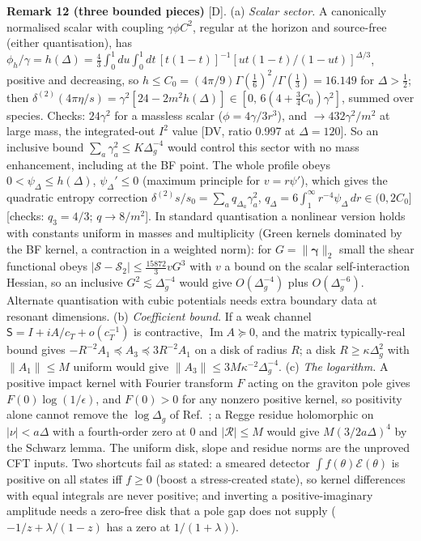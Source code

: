 \textbf{Remark 12 (three bounded pieces)} [D]. (a) \emph{Scalar sector.} A canonically normalised scalar with coupling $\gamma\phi C^2$, regular at the
horizon and source-free (either quantisation), has $\phi_h/\gamma=h(\Delta)=\tfrac43\int_0^1\!du\int_0^1\!dt\,[t(1-t)]^{-1}[ut(1-t)/(1-ut)]^{\Delta/3}$,
positive and decreasing, so $h\le C_0=(4\pi/9)\Gamma(\tfrac16)^2/\Gamma(\tfrac13)=16.149$ for $\Delta>\tfrac12$; then
$\delta^{(2)}(4\pi\eta/s)=\gamma^2[24-2m^2h(\Delta)]\in[0,\,6(4+\tfrac34C_0)\gamma^2]$, summed over species. Checks: $24\gamma^2$ for a massless scalar
($\phi=4\gamma/3r^3$), and $\to432\gamma^2/m^2$ at large mass, the integrated-out $I^2$ value [DV, ratio 0.997 at $\Delta=120$]. So an inclusive bound
$\sum_a\gamma_a^2\le K\Delta_g^{-4}$ would control this sector with no mass enhancement, including at the BF point. The whole profile obeys $0<\psi_\Delta\le h(\Delta)$, $\psi_\Delta'\le0$ (maximum principle for $v=r\psi'$), which gives the quadratic entropy
correction $\delta^{(2)}s/s_0=\sum_a q_{\Delta_a}\gamma_a^2$, $q_\Delta=6\int_1^\infty r^{-4}\psi_\Delta\,dr\in(0,2C_0]$ [checks: $q_3=4/3$; $q\to8/m^2$]. In
standard quantisation a nonlinear version holds with constants uniform in masses and multiplicity (Green kernels dominated by the BF kernel, a contraction
in a weighted norm): for $G=\|\boldsymbol\gamma\|_2$ small the shear functional obeys $|\mathcal S-\mathcal S_2|\le\tfrac{15872}{3}vG^3$ with $v$ a bound on
the scalar self-interaction Hessian, so an inclusive $G^2\lesssim\Delta_g^{-4}$ would give $O(\Delta_g^{-4})$ plus $O(\Delta_g^{-6})$. Alternate quantisation
with cubic potentials needs extra boundary data at resonant dimensions. (b) \emph{Coefficient bound.} If a
weak channel $\mathsf S=I+iA/c_T+o(c_T^{-1})$ is contractive, $\operatorname{Im}A\succeq0$, and the matrix typically-real bound gives
$-R^{-2}A_1\preceq A_3\preceq3R^{-2}A_1$ on a disk of radius $R$; a disk $R\ge\kappa\Delta_g^2$ with $\|A_1\|\le M$ uniform would give $\|A_3\|\le3M\kappa^{-2}\Delta_g^{-4}$.
(c) \emph{The logarithm.} A positive impact kernel with Fourier transform $F$ acting on the graviton pole gives $F(0)\log(1/\epsilon)$, and $F(0)>0$
for any nonzero positive kernel, so positivity alone cannot remove the $\log\Delta_g$ of Ref.~\cite{AKT}; a Regge residue holomorphic on
$|\nu|<a\Delta$ with a fourth-order zero at 0 and $|\mathcal R|\le M$ would give $M(3/2a\Delta)^4$ by the Schwarz lemma. The uniform disk, slope and
residue norms are the unproved CFT inputs. Two shortcuts fail as stated: a smeared detector $\int f(\theta)\mathcal E(\theta)$ is positive on all states iff $f\ge0$ (boost a stress-created
state), so kernel differences with equal integrals are never positive; and inverting a positive-imaginary amplitude needs a zero-free disk that a pole
gap does not supply ($-1/z+\lambda/(1-z)$ has a zero at $1/(1+\lambda)$).

